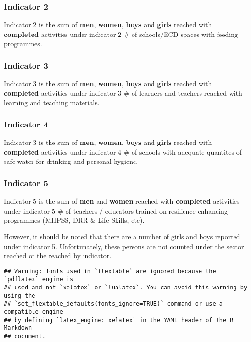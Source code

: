 \documentclass[
]{article}
\begin{document}
\renewcommand*{\arraystretch}{1}

\hypertarget{indicator-2}{%
\subsubsection{Indicator 2}\label{indicator-2}}

Indicator 2 is the sum of \textbf{men}, \textbf{women}, \textbf{boys}
and \textbf{girls} reached with \textbf{completed} activities under
indicator 2 \# of schools/ECD spaces with feeding programmes.

\hypertarget{indicator-3}{%
\subsubsection{Indicator 3}\label{indicator-3}}

Indicator 3 is the sum of \textbf{men}, \textbf{women}, \textbf{boys}
and \textbf{girls} reached with \textbf{completed} activities under
indicator 3 \# of learners and teachers reached with learning and
teaching materials.

\hypertarget{indicator-4}{%
\subsubsection{Indicator 4}\label{indicator-4}}

Indicator 3 is the sum of \textbf{men}, \textbf{women}, \textbf{boys}
and \textbf{girls} reached with \textbf{completed} activities under
indicator 4 \# of schools with adequate quantites of safe water for
drinking and personal hygiene.

\hypertarget{indicator-5}{%
\subsubsection{Indicator 5}\label{indicator-5}}

Indicator 5 is the sum of \textbf{men} and \textbf{women} reached with
\textbf{completed} activities under indicator 5 \# of teachers /
educators trained on resilience enhancing programmes (MHPSS, DRR \& Life
Skills, etc).

However, it should be noted that there are a number of girls and boys
reported under indicator 5. Unfortunately, these persons are not counted
under the sector reached or the reached by indicator.

\begin{verbatim}
## Warning: fonts used in `flextable` are ignored because the `pdflatex` engine is
## used and not `xelatex` or `lualatex`. You can avoid this warning by using the
## `set_flextable_defaults(fonts_ignore=TRUE)` command or use a compatible engine
## by defining `latex_engine: xelatex` in the YAML header of the R Markdown
## document.
\end{verbatim}
\end{document}
